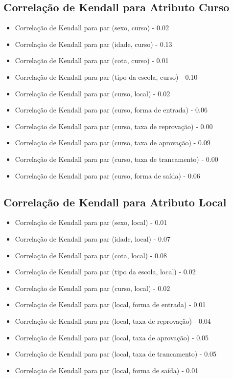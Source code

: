 \subsection{Correlação de Kendall para Atributo Curso}
\begin{itemize}
    \item Correlação de Kendall para par (sexo, curso) - 0.02
    \item Correlação de Kendall para par (idade, curso) - 0.13
    \item Correlação de Kendall para par (cota, curso) - 0.01
    \item Correlação de Kendall para par (tipo da escola, curso) - 0.10
    \item Correlação de Kendall para par (curso, local) - 0.02
    \item Correlação de Kendall para par (curso, forma de entrada) - 0.06
    \item Correlação de Kendall para par (curso, taxa de reprovação) - 0.00
    \item Correlação de Kendall para par (curso, taxa de aprovação) - 0.09
    \item Correlação de Kendall para par (curso, taxa de trancamento) - 0.00
    \item Correlação de Kendall para par (curso, forma de saída) - 0.06
\end{itemize}

\subsection{Correlação de Kendall para Atributo Local}
\begin{itemize}
    \item Correlação de Kendall para par (sexo, local) - 0.01
    \item Correlação de Kendall para par (idade, local) - 0.07
    \item Correlação de Kendall para par (cota, local) - 0.08
    \item Correlação de Kendall para par (tipo da escola, local) - 0.02
    \item Correlação de Kendall para par (curso, local) - 0.02
    \item Correlação de Kendall para par (local, forma de entrada) - 0.01
    \item Correlação de Kendall para par (local, taxa de reprovação) - 0.04
    \item Correlação de Kendall para par (local, taxa de aprovação) - 0.05
    \item Correlação de Kendall para par (local, taxa de trancamento) - 0.05
    \item Correlação de Kendall para par (local, forma de saída) - 0.01
\end{itemize}

